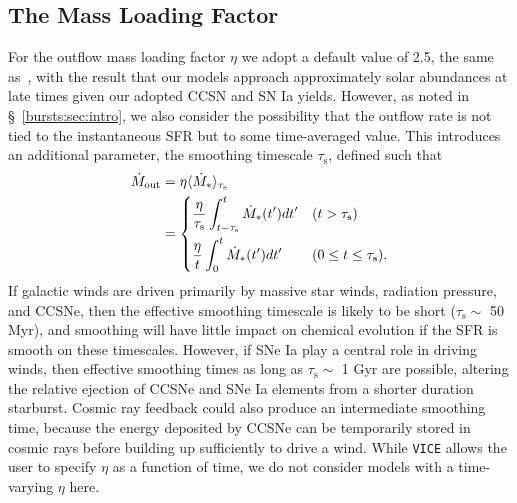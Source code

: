 \subsection{The Mass Loading Factor} 
For the outflow mass loading factor $\eta$ we adopt a default value of 2.5, 
the same as~\citet{Weinberg2017b}, with the result that our models 
approach approximately solar abundances at late times given our adopted CCSN 
and SN Ia yields. However, as noted in \S~\ref{bursts:sec:intro}, we also 
consider the possibility that the outflow rate is not tied to the 
instantaneous SFR but to some time-averaged value. This introduces an 
additional parameter, the smoothing timescale $\tau_\text{s}$, defined such 
that 
\begin{equation}\begin{split}
\label{bursts:eq:tau_s}
\dot{M}_\text{out} &= \eta\langle\dot{M}_*\rangle_{\tau_\text{s}} \\ 
&= \begin{dcases}
\frac{\eta}{\tau_\text{s}}\int_{t - \tau_\text{s}}^{t} \dot{M}_*(t') dt' & 
(t > \tau_\text{s}) \\ 
\frac{\eta}{t}\int_{0}^{t} \dot{M}_*(t') dt' & (0 \leq t \leq \tau_\text{s}) . 
\end{dcases}
\end{split}\end{equation} 
If galactic winds are driven primarily by massive star winds, radiation 
pressure, and CCSNe, then the effective smoothing timescale is likely to be 
short ($\tau_\text{s}\sim$ 50 Myr), and smoothing will have little impact on 
chemical evolution if the SFR is smooth on these timescales. However, if SNe 
Ia play a central role in driving winds, then effective smoothing times as 
long as $\tau_\text{s}\sim$ 1 Gyr are possible, altering the relative ejection 
of CCSNe and SNe Ia elements from a shorter duration starburst. Cosmic ray 
feedback could also produce an intermediate smoothing time, because the 
energy deposited by CCSNe can be temporarily stored in cosmic rays before 
building up sufficiently to drive a wind. While \texttt{VICE} allows the user 
to specify $\eta$ as a function of time, we do not consider models with a 
time-varying $\eta$ here. 

